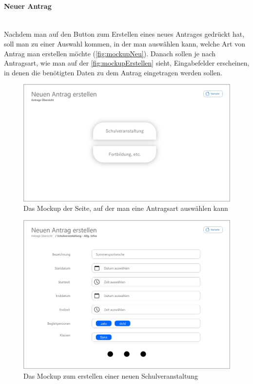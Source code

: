 \paragraph{Neuer Antrag}
~\\
Nachdem man auf den Button zum Erstellen eines neues Antrages gedrückt hat, soll man zu einer Auswahl kommen, in der man auswählen kann, welche Art von Antrag man erstellen möchte (\autoref{fig:mockupNeu}). Danach sollen je nach Antragsart, wie man auf der \autoref{fig:mockupErstellen} sieht, Eingabefelder erscheinen, in denen die benötigten Daten zu dem Antrag eingetragen werden sollen.
\begin{figure}[H]
	\centering
	\includegraphics[width=1\linewidth]{images/ldehner_konzept/Mockup-Neuer-Antrag}
	\caption[Mockup neuer Antrag]{Das Mockup der Seite, auf der man eine Antragsart auswählen kann}
	\label{fig:mockupNeu}
\end{figure}
\begin{figure}[H]
	\centering
	\includegraphics[width=1\linewidth]{images/ldehner_konzept/Mockup-Antrag-erstellen}
	\caption[Mockup Antrag erstellen]{Das Mockup zum erstellen einer neuen Schulveranstaltung}
	\label{fig:mockupErstellen}
\end{figure}
